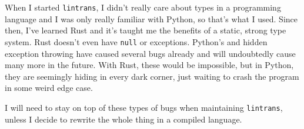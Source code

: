 \documentclass[../main.tex]{subfiles}
\begin{document}
When I started \texttt{lintrans}, I didn't really care about types in a programming language and I was only really familiar with Python, so that's what I used. Since then, I've learned Rust and it's taught me the benefits of a static, strong type system. Rust doesn't even have \texttt{null} or exceptions. Python's  and hidden exception throwing have caused several bugs already and will undoubtedly cause many more in the future. With Rust, these would be impossible, but in Python, they are seemingly hiding in every dark corner, just waiting to crash the program in some weird edge case.

I will need to stay on top of these types of bugs when maintaining \texttt{lintrans}, unless I decide to rewrite the whole thing in a compiled language.
\end{document}
